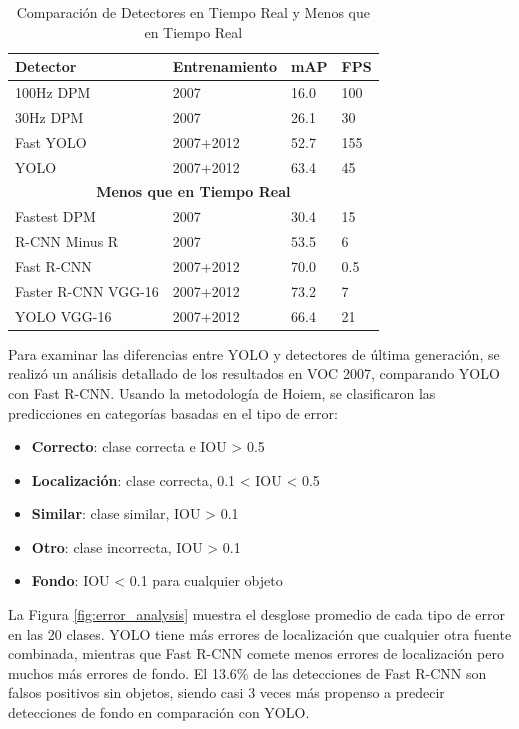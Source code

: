 \begin{table}[H]
	\centering
	\caption{Comparación de Detectores en Tiempo Real y Menos que en Tiempo Real}
	\label{tab:real-time-detectors}
	\begin{tabular}{|l|l|l|l|}
		\hline
		\textbf{Detector} & \textbf{Entrenamiento} & \textbf{mAP} & \textbf{FPS} \\ \hline
		100Hz DPM  & 2007 & 16.0 & 100 \\ \hline
		30Hz DPM  & 2007 & 26.1 & 30 \\ \hline
		Fast YOLO & 2007+2012 & 52.7 & 155 \\ \hline
		YOLO & 2007+2012 & 63.4 & 45 \\ \hline
		\multicolumn{4}{|c|}{\textbf{Menos que en Tiempo Real}} \\ \hline
		Fastest DPM  & 2007 & 30.4 & 15 \\ \hline
		R-CNN Minus R  & 2007 & 53.5 & 6 \\ \hline
		Fast R-CNN  & 2007+2012 & 70.0 & 0.5 \\ \hline
		Faster R-CNN VGG-16  & 2007+2012 & 73.2 & 7 \\ \hline
		YOLO VGG-16 & 2007+2012 & 66.4 & 21 \\ \hline
	\end{tabular}
\end{table}


Para examinar las diferencias entre YOLO y detectores de última generación, se realizó un análisis detallado de los resultados en VOC 2007, comparando YOLO con Fast R-CNN. Usando la metodología de Hoiem, se clasificaron las predicciones en categorías basadas en el tipo de error:

\begin{itemize}
	\item \textbf{Correcto}: clase correcta e IOU > 0.5
	\item \textbf{Localización}: clase correcta, 0.1 < IOU < 0.5
	\item \textbf{Similar}: clase similar, IOU > 0.1
	\item \textbf{Otro}: clase incorrecta, IOU > 0.1
	\item \textbf{Fondo}: IOU < 0.1 para cualquier objeto
\end{itemize}

La Figura \ref{fig:error_analysis} muestra el desglose promedio de cada tipo de error en las 20 clases. YOLO tiene más errores de localización que cualquier otra fuente combinada, mientras que Fast R-CNN comete menos errores de localización pero muchos más errores de fondo. El 13.6\% de las detecciones de Fast R-CNN son falsos positivos sin objetos, siendo casi 3 veces más propenso a predecir detecciones de fondo en comparación con YOLO.

